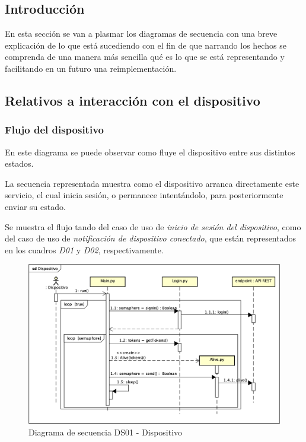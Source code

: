 
\subsection{Introducción}

En esta sección se van a plasmar los diagramas de secuencia con una breve explicación de lo que está sucediendo con el fin de que narrando los hechos se comprenda de una manera más sencilla qué es lo que se está representando y facilitando en un futuro una reimplementación.

\subsection{Relativos a interacción con el dispositivo}

\subsubsection{Flujo del dispositivo}

En este diagrama se puede observar como fluye el dispositivo entre sus distintos estados.

La secuencia representada muestra como el dispositivo arranca directamente este servicio, el cual inicia sesión, o permanece intentándolo, para posteriormente enviar su estado.

Se muestra el flujo tando del caso de uso de \textit{inicio de sesión del dispositivo}, como del caso de uso de \textit{notificación de dispositivo conectado}, que están representados en los cuadros \textit{D01} y \textit{D02}, respectivamente.

\begin{figure}[H]
    \centering
    \includegraphics[width=12cm]{./img/sequence/diagram/device.png}
    \caption{Diagrama de secuencia DS01 - Dispositivo}
    \label{fig:seq.device}
\end{figure}

